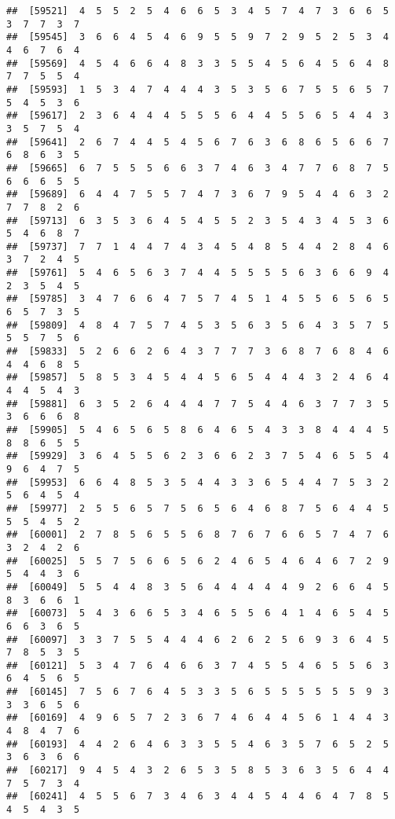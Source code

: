\documentclass[
]{book}
\begin{document}
\begin{verbatim}
##  [59521]  4  5  5  2  5  4  6  6  5  3  4  5  7  4  7  3  6  6  5  3  7  7  3  7
##  [59545]  3  6  6  4  5  4  6  9  5  5  9  7  2  9  5  2  5  3  4  4  6  7  6  4
##  [59569]  4  5  4  6  6  4  8  3  3  5  5  4  5  6  4  5  6  4  8  7  7  5  5  4
##  [59593]  1  5  3  4  7  4  4  4  3  5  3  5  6  7  5  5  6  5  7  5  4  5  3  6
##  [59617]  2  3  6  4  4  4  5  5  5  6  4  4  5  5  6  5  4  4  3  3  5  7  5  4
##  [59641]  2  6  7  4  4  5  4  5  6  7  6  3  6  8  6  5  6  6  7  6  8  6  3  5
##  [59665]  6  7  5  5  5  6  6  3  7  4  6  3  4  7  7  6  8  7  5  6  6  6  5  5
##  [59689]  6  4  4  7  5  5  7  4  7  3  6  7  9  5  4  4  6  3  2  7  7  8  2  6
##  [59713]  6  3  5  3  6  4  5  4  5  5  2  3  5  4  3  4  5  3  6  5  4  6  8  7
##  [59737]  7  7  1  4  4  7  4  3  4  5  4  8  5  4  4  2  8  4  6  3  7  2  4  5
##  [59761]  5  4  6  5  6  3  7  4  4  5  5  5  5  6  3  6  6  9  4  2  3  5  4  5
##  [59785]  3  4  7  6  6  4  7  5  7  4  5  1  4  5  5  6  5  6  5  6  5  7  3  5
##  [59809]  4  8  4  7  5  7  4  5  3  5  6  3  5  6  4  3  5  7  5  5  5  7  5  6
##  [59833]  5  2  6  6  2  6  4  3  7  7  7  3  6  8  7  6  8  4  6  4  4  6  8  5
##  [59857]  5  8  5  3  4  5  4  4  5  6  5  4  4  4  3  2  4  6  4  4  4  5  4  3
##  [59881]  6  3  5  2  6  4  4  4  7  7  5  4  4  6  3  7  7  3  5  3  6  6  6  8
##  [59905]  5  4  6  5  6  5  8  6  4  6  5  4  3  3  8  4  4  4  5  8  8  6  5  5
##  [59929]  3  6  4  5  5  6  2  3  6  6  2  3  7  5  4  6  5  5  4  9  6  4  7  5
##  [59953]  6  6  4  8  5  3  5  4  4  3  3  6  5  4  4  7  5  3  2  5  6  4  5  4
##  [59977]  2  5  5  6  5  7  5  6  5  6  4  6  8  7  5  6  4  4  5  5  5  4  5  2
##  [60001]  2  7  8  5  6  5  5  6  8  7  6  7  6  6  5  7  4  7  6  3  2  4  2  6
##  [60025]  5  5  7  5  6  6  5  6  2  4  6  5  4  6  4  6  7  2  9  5  4  4  3  6
##  [60049]  5  5  4  4  8  3  5  6  4  4  4  4  4  9  2  6  6  4  5  8  3  6  6  1
##  [60073]  5  4  3  6  6  5  3  4  6  5  5  6  4  1  4  6  5  4  5  6  6  3  6  5
##  [60097]  3  3  7  5  5  4  4  4  6  2  6  2  5  6  9  3  6  4  5  7  8  5  3  5
##  [60121]  5  3  4  7  6  4  6  6  3  7  4  5  5  4  6  5  5  6  3  6  4  5  6  5
##  [60145]  7  5  6  7  6  4  5  3  3  5  6  5  5  5  5  5  5  9  3  3  3  6  5  6
##  [60169]  4  9  6  5  7  2  3  6  7  4  6  4  4  5  6  1  4  4  3  4  8  4  7  6
##  [60193]  4  4  2  6  4  6  3  3  5  5  4  6  3  5  7  6  5  2  5  3  6  3  6  6
##  [60217]  9  4  5  4  3  2  6  5  3  5  8  5  3  6  3  5  6  4  4  7  5  7  3  4
##  [60241]  4  5  5  6  7  3  4  6  3  4  4  5  4  4  6  4  7  8  5  4  5  4  3  5

\end{verbatim}
\end{document}

